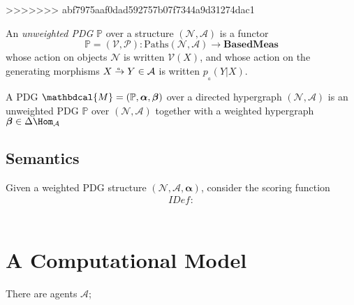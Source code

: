 \documentclass[twoside]{article} %
\theoremstyle{plain}
\theoremstyle{definition}
\newcommand{\BaseMeas}{\mathbf{BasedMeas}}
\newcommand{\ssub}[1]{_{\!_{#1}\!}}
\newcommand{\V}{\mathcal V}
\newcommand{\N}{\mathcal N}
\newcommand{\Ar}{\mathcal A}
\newcommand{\src}{\mathrm{Src}}
\newcommand{\tgt}{\mathrm{Tgt}}
\newcommand{\balpha}{\boldsymbol\alpha}
\newcommand{\bbeta}{\boldsymbol\beta}
\newcommand{\dg}[1]{\mathbdcal{#1}}
\newcommand{\IDef}[1]{\mathit{IDef}_{\!#1}}
\newcommand{\ed}[3]{#2%
    	  \overset{\smash{\mskip-5mu\raisebox{-1pt}{$\scriptscriptstyle
    	        #1$}}}{\rightarrow} #3}
\begin{document}
>>>>>>> abf7975aaf0dad592757b07f7344a9d31274dac1
    
    \begin{defn}
        An \emph{unweighted PDG} $\mathbb P$ over a structure $(\N, \Ar)$ is a functor
        \[ 
            {\mathbb P} = (\V, \mathcal P)  : \mathrm{Paths}(\N, \Ar) \to  \BaseMeas
        \] 
        whose action on objects $\N$ is written $\V(X)$, and whose action on the generating morphisms $\ed aXY \in \Ar$ is written $p\ssub a(Y|X)$.
    \end{defn}   
    
    
    \begin{defn}[PDG]
        A PDG $\dg M = (\mathbb P, \balpha, \bbeta)$ over
        a directed hypergraph $(\N, \Ar)$ is an unweighted PDG $\mathbb P$ over $(\N, \Ar)$
        together with a 
        weighted hypergraph $\bbeta \in \Delta \Hom_{\mathcal A}$
        
    \end{defn}
    
    
    \subsection{Semantics}
    Given a weighted PDG structure $(\N, \Ar, \balpha)$, consider the scoring function 
    \begin{align*}
        \IDef{} : 
    \end{align*}
    
    
    
    \[ \] 

    
    
    \section{A Computational Model}
    There are agents $\mathcal A$; 
    \begin{center}
        \begin{tikzpicture}
            
        \end{tikzpicture}
    \end{center}
    
    
\end{document}
